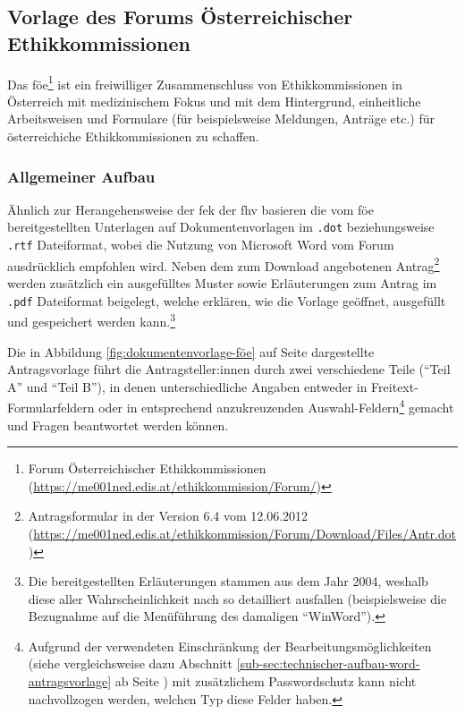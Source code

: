 \documentclass[a4paper,12pt,twoside]{scrreprt}
\begin{document}
\subsection{Vorlage des Forums Österreichischer Ethikkommissionen}
\label{sub-sec:vorlage-föe}

Das \ac{föe}\footnote{Forum Österreichischer Ethikkommissionen (\url{https://me001ned.edis.at/ethikkommission/Forum/})} ist ein freiwilliger Zusammenschluss von Ethikkommissionen in Österreich mit medizinischem Fokus und mit dem Hintergrund, einheitliche Arbeitsweisen und Formulare (für beispielsweise Meldungen, Anträge etc.) für österreichiche Ethikkommissionen zu schaffen. \cite{ethikkommission_der_medizinischen_universitat_graz_forum_2019}

\subsubsection*{Allgemeiner Aufbau}
\label{sub-sub-sec:föe-allgemeiner-aufbau}

Ähnlich zur Herangehensweise der \acl{fek} der \acl{fhv} basieren die vom \ac{föe} bereitgestellten Unterlagen auf Dokumentenvorlagen im \texttt{.dot} beziehungsweise \texttt{.rtf} Dateiformat, wobei die Nutzung von Microsoft Word vom Forum ausdrücklich empfohlen wird. Neben dem zum Download angebotenen Antrag\footnote{Antragsformular in der Version 6.4 vom 12.06.2012 (\url{https://me001ned.edis.at/ethikkommission/Forum/Download/Files/Antr.dot})} werden zusätzlich ein ausgefülltes Muster sowie Erläuterungen zum Antrag im \texttt{.pdf} Dateiformat beigelegt, welche erklären, wie die Vorlage geöffnet, ausgefüllt und gespeichert werden kann.\footnote{Die bereitgestellten Erläuterungen stammen aus dem Jahr 2004, weshalb diese aller Wahrscheinlichkeit nach so detailliert ausfallen (beispielsweise die Bezugnahme auf die Menüführung des damaligen \enquote{WinWord}).} \cite{ethikkommission_der_medizinischen_universitat_graz_download_2012}

\medskip

Die in Abbildung \ref{fig:dokumentenvorlage-föe} auf Seite \pageref{fig:dokumentenvorlage-föe} dargestellte Antragsvorlage führt die Antragsteller:innen durch zwei verschiedene Teile (\enquote{Teil A} und \enquote{Teil B}), in denen unterschiedliche Angaben entweder in Freitext-Formularfeldern oder in entsprechend anzukreuzenden Auswahl-Feldern\footnote{Aufgrund der verwendeten Einschränkung der Bearbeitungsmöglichkeiten (siehe vergleichsweise dazu Abschnitt \ref{sub-sec:technischer-aufbau-word-antragsvorlage} ab Seite \pageref{sub-sec:technischer-aufbau-word-antragsvorlage}) mit zusätzlichem Passwordschutz kann nicht nachvollzogen werden, welchen Typ diese Felder haben.} gemacht und Fragen beantwortet werden können.
\end{document}
